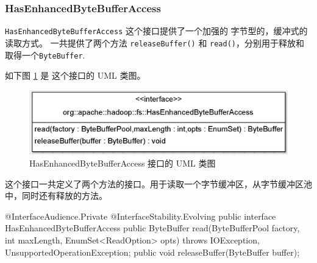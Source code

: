 \subsubsection{HasEnhancedByteBufferAccess}
\label{sec:uml:input:hasenhancedbytebufferaccess}

\lstinline|HasEnhancedByteBufferAccess| 这个接口提供了一个加强的 字节型的，缓冲式的读取方式。
一共提供了两个方法 \lstinline|releaseBuffer()| 和 \lstinline|read()|，分别用于释放和取得一个\lstinline|ByteBuffer|.

如下图 \ref{fig:HasEnhancedByteBufferAccess} 是 这个接口的 UML 类图。
\begin{figure}
\centering
\includegraphics[width=1\linewidth]{UML/inputstream/HasEnhancedByteBufferAccess}
\caption{HasEnhancedByteBufferAccess 接口的 UML 类图}
\label{fig:HasEnhancedByteBufferAccess}
\end{figure}

这个接口一共定义了两个方法的接口。用于读取一个字节缓冲区，从字节缓冲区池中，同时还有释放的方法。
\begin{java}
@InterfaceAudience.Private
@InterfaceStability.Evolving
public interface HasEnhancedByteBufferAccess {
    public ByteBuffer read(ByteBufferPool factory, int maxLength, EnumSet<ReadOption> opts) throws IOException, UnsupportedOperationException;
    public void releaseBuffer(ByteBuffer buffer);
}    
\end{java}